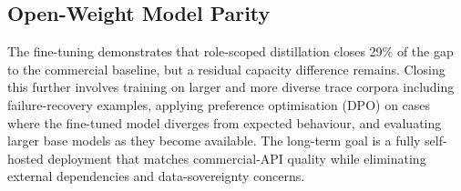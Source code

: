 \subsection{Open-Weight Model Parity}

The fine-tuning demonstrates that role-scoped distillation closes 29\% of the gap to the commercial baseline, but a residual capacity difference remains. Closing this further involves training on larger and more diverse trace corpora including failure-recovery examples, applying preference optimisation (DPO) on cases where the fine-tuned model diverges from expected behaviour, and evaluating larger base models as they become available. The long-term goal is a fully self-hosted deployment that matches commercial-API quality while eliminating external dependencies and data-sovereignty concerns.
